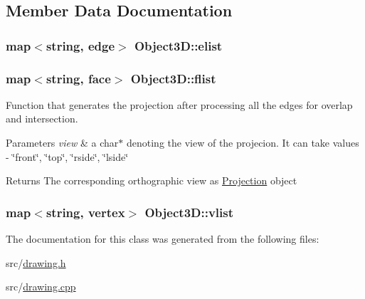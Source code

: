 \subsection{Member Data Documentation}
\subsubsection[{\texorpdfstring{elist}{elist}}]{\setlength{\rightskip}{0pt plus 5cm}map$<$string, {\bf edge}$>$ Object3\+D\+::elist}\hypertarget{class_object3_d_a3746f6833c04ee03c7d309f1f27e2267}{}\label{class_object3_d_a3746f6833c04ee03c7d309f1f27e2267}
\subsubsection[{\texorpdfstring{flist}{flist}}]{\setlength{\rightskip}{0pt plus 5cm}map$<$string, {\bf face}$>$ Object3\+D\+::flist}\hypertarget{class_object3_d_afadd8fcbcdddade128855058aacb72b9}{}\label{class_object3_d_afadd8fcbcdddade128855058aacb72b9}
Function that generates the projection after processing all the edges for overlap and intersection. 
\begin{DoxyParams}{Parameters}
{\em view} & a char$\ast$ denoting the view of the projecion. It can take values -\/ \char`\"{}front\char`\"{}, \char`\"{}top\char`\"{}, \char`\"{}rside\char`\"{}, \char`\"{}lside\char`\"{} \\
\hline
\end{DoxyParams}
\begin{DoxyReturn}{Returns}
The corresponding orthographic view as \hyperlink{class_projection}{Projection} object 
\end{DoxyReturn}
\subsubsection[{\texorpdfstring{vlist}{vlist}}]{\setlength{\rightskip}{0pt plus 5cm}map$<$string, {\bf vertex}$>$ Object3\+D\+::vlist}\hypertarget{class_object3_d_a3da915f1f23f78d6ae2437473e351c4c}{}\label{class_object3_d_a3da915f1f23f78d6ae2437473e351c4c}


The documentation for this class was generated from the following files\+:\begin{DoxyCompactItemize}
\item 
src/\hyperlink{drawing_8h}{drawing.\+h}\item 
src/\hyperlink{drawing_8cpp}{drawing.\+cpp}\end{DoxyCompactItemize}
